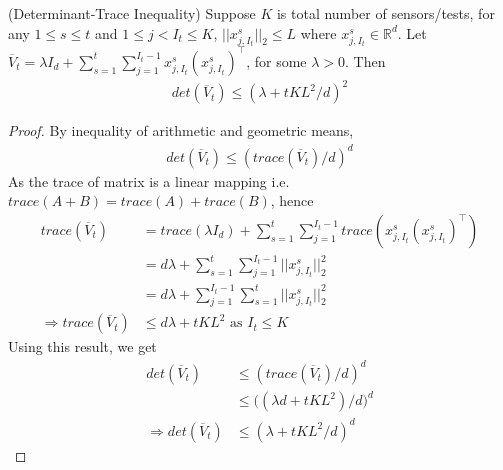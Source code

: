 \begin{lem}
	\label{lem:det_trc}
	(Determinant-Trace Inequality) Suppose $K$ is total number of sensors/tests, for any $1 \le s \le t$ and $1 \le j < I_t \le K$, $||x_{j, I_t}^s||_2 \le L$ where $x_{j, I_t}^s \in \mathbb{R}^d$. Let $\overline{V}_t = \lambda I_d + \sum_{s=1}^{t}\sum_{j=1}^{I_t-1}x_{j, I_t}^s(x_{j, I_t}^s)^\top$, for some $\lambda > 0$. Then  
	\begin{align*}
	det(\overline{V}_t) \le (\lambda + tKL^2/d)^2
	\end{align*}
	\begin{proof} By inequality of arithmetic and geometric means,
		\begin{align*}
		det(\overline{V}_t) \le (trace(\overline{V}_t)/d)^d
		\end{align*}
		As the trace of matrix is a linear mapping i.e. $trace(A+B) = trace(A) + trace(B)$, hence
		\begin{align*}
		trace(\overline{V}_t) &= trace(\lambda I_d) + \sum_{s=1}^{t}\sum_{j=1}^{I_t-1}trace(x_{j, I_t}^s(x_{j, I_t}^s)^\top) \\
		&= d\lambda + \sum_{s=1}^{t}\sum_{j=1}^{I_t-1}||x_{j, I_t}^s||_2^2 \\
		&= d\lambda +\sum_{j=1}^{I_t-1}\sum_{s=1}^{t}||x_{j, I_t}^s||_2^2 \\
		\Rightarrow trace(\overline{V}_t) &\le d\lambda + tKL^2 \text{ as } I_t \le K
		\end{align*}
		Using this result, we get
		\begin{align*}
		det(\overline{V}_t) &\le (trace(\overline{V}_t)/d)^d \\
		&\le \big((\lambda d + tKL^2)/d\big)^d \\
		\Rightarrow det(\overline{V}_t) &\le (\lambda + tKL^2/d)^d
		\end{align*}
	\end{proof}
\end{lem}

